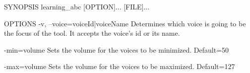 SYNOPSIS
  learning_abc [OPTION]... [FILE]...

OPTIONS
  -v, --voice=voiceId|voiceName
    Determines which voice is going to be the focus of the tool. It accepts the voice's id or its name.

  -min=volume
    Sets the volume for the voices to be minimized. Default=50

  -max=volume
    Sets the volume for the voices to be maximized. Default=127
